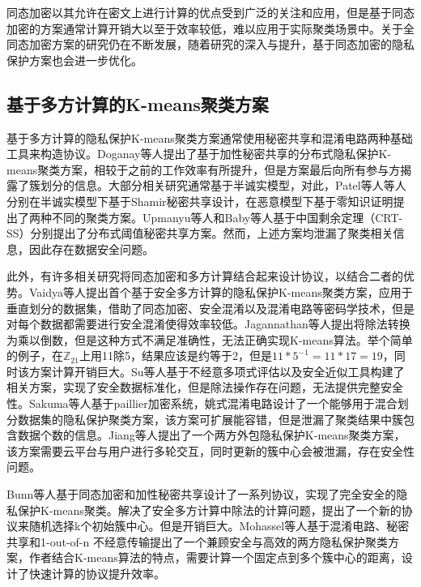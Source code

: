 同态加密以其允许在密文上进行计算的优点受到广泛的关注和应用，但是基于同态加密的方案通常计算开销大以至于效率较低，难以应用于实际聚类场景中。关于全同态加密方案的研究仍在不断发展，随着研究的深入与提升，基于同态加密的隐私保护方案也会进一步优化。

\subsection{基于多方计算的K-means聚类方案}
基于多方计算的隐私保护K-means聚类方案通常使用秘密共享和混淆电路两种基础工具来构造协议。Doganay等人\cite{doganay2008distributed}提出了基于加性秘密共享的分布式隐私保护K-means聚类方案，相较于之前的工作效率有所提升，但是方案最后向所有参与方揭露了簇划分的信息。大部分相关研究通常基于半诚实模型，对此，Patel等人\cite{patel2012efficient,patel2013privacy}等人分别在半诚实模型下基于Shamir秘密共享设计，在恶意模型下基于零知识证明提出了两种不同的聚类方案。Upmanyu等人\cite{upmanyu2010efficient}和Baby等人\cite{baby2016distributed}基于中国剩余定理（CRT-SS）分别提出了分布式阈值秘密共享方案。然而，上述方案均泄漏了聚类相关信息，因此存在数据安全问题\cite{hegde2021sok}。

此外，有许多相关研究将同态加密和多方计算结合起来设计协议，以结合二者的优势。Vaidya等人\cite{vaidya2003privacy}提出首个基于安全多方计算的隐私保护K-means聚类方案\cite{meskine2012privacy}，应用于垂直划分的数据集，借助了同态加密、安全混淆\cite{du2001privacy}以及混淆电路等密码学技术，但是对每个数据都需要进行安全混淆使得效率较低。Jagannathan等人\cite{jagannathan2005privacy}提出将除法转换为乘以倒数，但是这种方式不满足准确性，无法正确实现K-means算法。举个简单的例子，在$\mathbb{Z}_{21}$上用11除5，结果应该是约等于2，但是$11*5^{-1}=11*17=19$，同时该方案计算开销巨大\cite{bunn2007secure}。Su等人\cite{su2007privacy}基于不经意多项式评估以及安全近似工具构建了相关方案，实现了安全数据标准化，但是除法操作存在问题，无法提供完整安全性。Sakuma等人\cite{sakuma2010large}基于paillier加密系统，姚式混淆电路设计了一个能够用于混合划分数据集的隐私保护聚类方案，该方案可扩展能容错，但是泄漏了聚类结果中簇包含数据个数的信息。Jiang等人\cite{jiang2020efficient}提出了一个两方外包隐私保护K-means聚类方案，该方案需要云平台与用户进行多轮交互，同时更新的簇中心会被泄漏，存在安全性问题。

Bunn等人\cite{bunn2007secure}基于同态加密和加性秘密共享设计了一系列协议，实现了完全安全的隐私保护K-means聚类。解决了安全多方计算中除法的计算问题，提出了一个新的协议来随机选择k个初始簇中心。但是开销巨大。Mohassel等人\cite{mohassel2019practical}基于混淆电路、秘密共享和1-out-of-n 不经意传输提出了一个兼顾安全与高效的两方隐私保护聚类方案，作者结合K-means算法的特点，需要计算一个固定点到多个簇中心的距离，设计了快速计算的协议提升效率。


